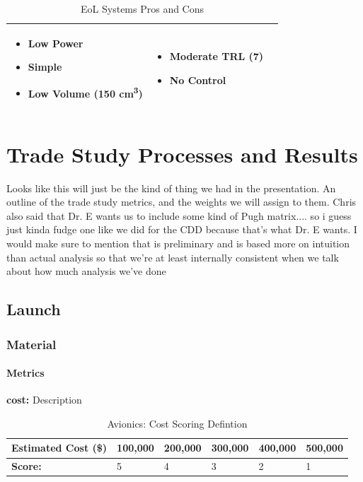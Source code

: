 \documentclass[3p]{elsarticle}
\begin{document}
\begin{table}[H]
\begin{tabular}{|p{}|p{}|p{}|}
    \begin{itemize}
        \item Low Power
        \item Simple
        \item Low Volume (150 cm\textsuperscript{3})\cite{RODEO_Presentation}
    \end{itemize}
    &
    \begin{itemize}
        \item Moderate TRL (7)
        \item No Control
    \end{itemize}
    \\
\hline
\end{tabular}
\caption{EoL Systems Pros and Cons}
\label{tbl:Eol_ProCon}
\end{table}

\section{Trade Study Processes and Results}
Looks like this will just be the kind of thing we had in the presentation. An outline of the trade study metrics, and the weights we will assign to them. Chris also said that Dr. E wants us to include some kind of Pugh matrix.... so i guess just kinda fudge one like we did for the CDD because that's what Dr. E wants. I would make sure to mention that is preliminary and is based more on intuition than actual analysis so that we're at least internally consistent when we talk about how much analysis we've done

\subsection{Launch}

\subsubsection{Material}
\paragraph{Metrics}
\textbf{cost:} Description
\begin{table}[H]
\centering
\begin{tabular}{|l|l|l|l|l|l|} 
\hline
    \textbf{Estimated Cost (\$) } & 100,000 & 200,000 & 300,000 & 400,000 & 500,000
    \\
\hline
    \textbf{Score:} & 5 & 4 & 3 & 2 & 1
    \\
\hline
\end{tabular}
\caption{Avionics: Cost Scoring Defintion \cite{einstein}}
\label{tbl:avioniccost}
\end{table}
\end{document}
